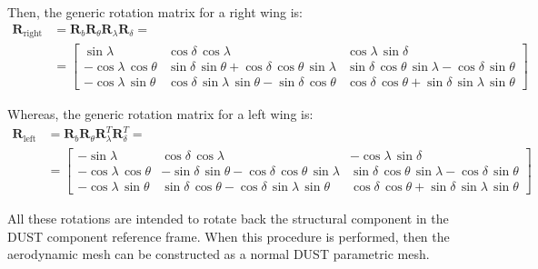 Then, the generic rotation matrix for a right wing is: 
\begin{align*}\label{eq:mbdydust:rightmat}
    \mathbf{R}_{\text{right}}& =   \mathbf{R}_{b}\mathbf{R}_{\theta}\mathbf{R}_{\lambda}\mathbf{R}_{\delta} = \\
    &=\begin{bmatrix}
    \sin\lambda  & 
    \cos\delta \,\cos\lambda  & 
    \cos\lambda \,\sin\delta \\
    -\cos\lambda \,\cos\theta  & 
    \sin\delta \,\sin\theta +\cos\delta \,\cos\theta \,\sin\lambda  & 
    \sin\delta \,\cos\theta \,\sin\lambda -\cos\delta \,\sin\theta \\ 
    -\cos\lambda \,\sin\theta  & 
    \cos\delta \,\sin\lambda \,\sin\theta -\sin\delta \,\cos\theta  & 
    \cos\delta \,\cos\theta +\sin\delta \,\sin\lambda \,\sin\theta
    \end{bmatrix}
\end{align*}

Whereas, the generic rotation matrix for a left wing is: 
\begin{align*}
    \mathbf{R}_{\text{left}}&=   \mathbf{R}_{b}\mathbf{R}_{\theta}\mathbf{R}_{\lambda}^T\mathbf{R}_{\delta}^T =\\
    &=\begin{bmatrix} 
    -\sin\lambda  &
    \cos\delta \,\cos\lambda  &
    -\cos\lambda \,\sin\delta \\
    -\cos\lambda \,\cos\theta  & 
    -\sin\delta \,\sin\theta -\cos\delta \,\cos\theta \,\sin\lambda  & 
    \sin\delta \,\cos\theta \,\sin\lambda -\cos\delta \,\sin\theta \\ 
    -\cos\lambda \,\sin\theta  & 
    \sin\delta \,\cos\theta -\cos\delta \,\sin\lambda \,\sin\theta  &
    \cos\delta \,\cos\theta +\sin\delta \,\sin\lambda \,\sin\theta  
    \end{bmatrix}
\end{align*}

All these rotations are intended to rotate back the structural component in the DUST component reference frame. When this procedure is performed, then the aerodynamic mesh can be constructed as a normal DUST parametric mesh. 

